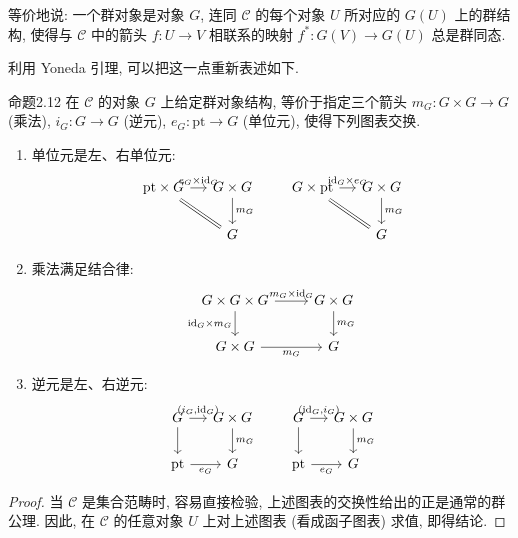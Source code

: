 等价地说: 一个群对象是对象 $G$, 连同 $\mathcal C$ 的每个对象 $U$ 所对应的 $G(U)$ 上的群结构, 使得与 $\mathcal C$ 中的箭头 $f:U\to V$ 相联系的映射 $f^*:G(V)\to G(U)$ 总是群同态.

利用 Yoneda 引理, 可以把这一点重新表述如下.

\begin{origstatement}{命题}{2.12}\label{ch02:prop212}
在 $\mathcal C$ 的对象 $G$ 上给定群对象结构, 等价于指定三个箭头 $m_G:G\times G\to G$ (乘法), $i_G:G\to
G$ (逆元), $e_G:\mathrm{pt}\to G$ (单位元), 使得下列图表交换.
\begin{enumerate}
\item[(i)] 单位元是左、右单位元:
\[
\begin{tikzcd}[column sep=small]
\mathrm{pt}\times G\arrow[r,"e_G\times\mathrm{id}_G"]\arrow[dr,equal]&G\times G\arrow[d,"m_G"]\\&G
\end{tikzcd}
\qquad
\begin{tikzcd}[column sep=small]
G\times\mathrm{pt}\arrow[r,"\mathrm{id}_G\times e_G"]\arrow[dr,equal]&G\times G\arrow[d,"m_G"]\\&G
\end{tikzcd}
\]
\item[(ii)] 乘法满足结合律:
\[
\begin{tikzcd}
G\times G\times G\arrow[r,"m_G\times\mathrm{id}_G"]\arrow[d,"\mathrm{id}_G\times m_G"']&G\times G\arrow[d,"m_G"]\\
G\times G\arrow[r,"m_G"']&G
\end{tikzcd}
\]
\item[(iii)] 逆元是左、右逆元:
\[
\begin{tikzcd}[column sep=small]
G\arrow[r,"{(i_G,\mathrm{id}_G)}"]\arrow[d]&G\times G\arrow[d,"m_G"]\\
\mathrm{pt}\arrow[r,"e_G"']&G
\end{tikzcd}
\qquad
\begin{tikzcd}[column sep=small]
G\arrow[r,"{(\mathrm{id}_G,i_G)}"]\arrow[d]&G\times G\arrow[d,"m_G"]\\
\mathrm{pt}\arrow[r,"e_G"']&G
\end{tikzcd}
\]
\end{enumerate}
\end{origstatement}
\begin{proof}
当 $\mathcal C$ 是集合范畴时, 容易直接检验, 上述图表的交换性给出的正是通常的群公理. 因此, 在 $\mathcal C$ 的任意对象 $U$ 上对上述图表 (看成函子图表) 求值, 即得结论.
\end{proof}

